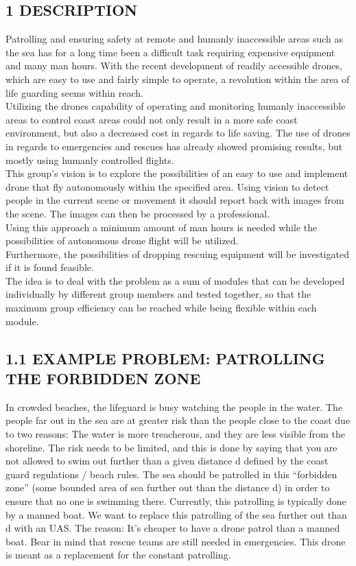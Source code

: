 \subsection*{1 DESCRIPTION}
Patrolling and ensuring safety at remote and humanly
 inaccessible areas such as the sea has for a long time been a difficult task requiring expensive equipment and many man hours. 
With the recent development of readily accessible drones, which are easy to use and fairly simple to operate, 
a revolution within the area of life guarding seems within reach.\\
Utilizing the drones capability of 
operating and monitoring humanly inaccessible areas
 to control coast areas could not only 
result in a more safe coast environment,
 but also a decreased cost in regards to life saving.
 The use of drones in regards to emergencies and
 rescues has already showed promising results, 
but mostly using humanly controlled flights.\\
This group's vision is to explore the possibilities
 of an easy to use and implement drone that fly 
autonomously within the specified area. Using vision to detect people in the current scene or movement it should report back with images from
the scene. The images can then be processed by
 a professional.\\ Using this approach a minimum
 amount of man hours is needed while the possibilities 
of autonomous drone flight will be utilized.\\ 
Furthermore, the possibilities of dropping rescuing
 equipment will be investigated if it is found feasible.\\
 The idea is to deal with the problem as a sum of modules
 that can be developed individually by different group
 members and tested together, so that the maximum group
 efficiency can be reached while being flexible within each module.\\
\subsection*{1.1 EXAMPLE PROBLEM: PATROLLING THE FORBIDDEN ZONE}
In crowded beaches, the lifeguard is busy
 watching the people in the water. 
The people far out in the sea are at greater
 risk than the people close to the coast due
 to two reasons: The water is more treacherous,
 and they are less visible from the shoreline.
The risk needs to be limited, and this is done
 by saying that you are not allowed to swim out
 further than a given distance d defined by the 
coast guard regulations / beach rules. 
The sea should be patrolled in this “forbidden zone” 
(some bounded area of sea further out than the distance d)
 in order to ensure that no one is swimming there.
 Currently, this patrolling is typically done by a manned boat.
 We want to replace this patrolling of the sea
 further out than d with an UAS.
The reason: It’s cheaper to have a drone patrol 
than a manned boat. Bear in mind that rescue teams
 are still needed in emergencies. This drone is meant
 as a replacement for the constant patrolling. \newline

